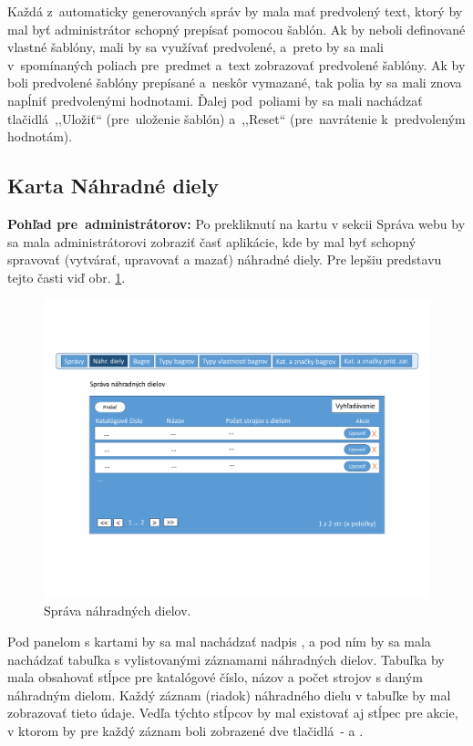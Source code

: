 Každá z~automaticky generovaných správ by mala mať predvolený text, ktorý by mal byť administrátor schopný prepísať pomocou šablón. Ak by neboli definované vlastné šablóny, mali by sa využívať predvolené, a~preto by sa mali v~spomínaných poliach pre~predmet a~text zobrazovať predvolené šablóny. Ak by boli predvolené šablóny prepísané a~neskôr vymazané, tak polia by sa mali znova napĺniť predvolenými hodnotami. Ďalej pod~poliami by sa mali nachádzať tlačidlá~,,Uložiť`` (pre~uloženie šablón) a~,,Reset`` (pre~navrátenie k~predvoleným hodnotám).

\subsection{Karta Náhradné diely}
\label{karta nahradne diely}

\textbf{Pohľad pre~administrátorov:} Po prekliknutí na kartu  v sekcii Správa webu by sa mala administrátorovi zobraziť časť aplikácie, kde by mal byť schopný spravovať (vytvárať, upravovať a mazať) náhradné diely. Pre lepšiu predstavu tejto časti viď obr. \ref{spare parts management}.

\begin{figure}[H]\centering
\includegraphics[width=140mm]{../img/UI concept/spare parts management}
\caption{Správa náhradných dielov.}
\label{spare parts management}
\end{figure}

Pod panelom s kartami by sa mal nachádzať nadpis , a pod ním by sa mala nachádzať tabuľka s vylistovanými záznamami náhradných dielov. Tabuľka by mala obsahovať stĺpce pre katalógové číslo, názov a počet strojov s daným náhradným dielom. Každý záznam (riadok) náhradného dielu v tabuľke by mal zobrazovať tieto údaje. Vedľa týchto stĺpcov by mal existovať aj stĺpec pre akcie, v ktorom by pre každý záznam boli zobrazené dve tlačidlá~-  a .

